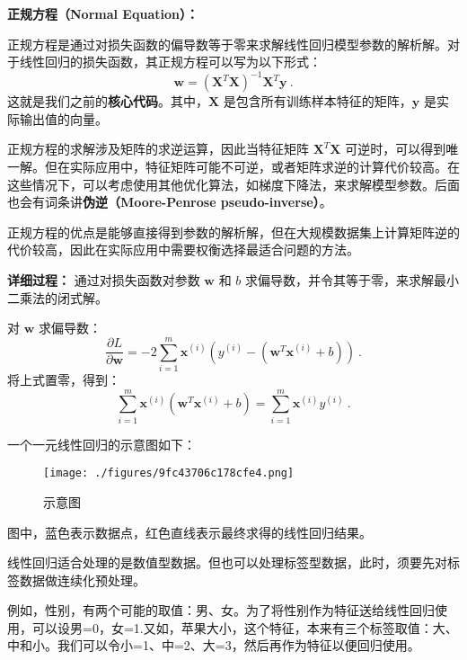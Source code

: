 \textbf{正规方程（Normal Equation）：}

正规方程是通过对损失函数的偏导数等于零来求解线性回归模型参数的解析解。对于线性回归的损失函数，其正规方程可以写为以下形式：
\begin{equation}
\mathbf{w} = (\mathbf{X}^T \mathbf{X})^{-1} \mathbf{X}^T \mathbf{y}~.
\end{equation}
这就是我们之前的\textbf{核心代码}。其中，$\mathbf{X}$ 是包含所有训练样本特征的矩阵，$\mathbf{y}$ 是实际输出值的向量。

正规方程的求解涉及矩阵的求逆运算，因此当特征矩阵 $\mathbf{X}^T \mathbf{X}$ 可逆时，可以得到唯一解。但在实际应用中，特征矩阵可能不可逆，或者矩阵求逆的计算代价较高。在这些情况下，可以考虑使用其他优化算法，如梯度下降法，来求解模型参数。后面也会有词条讲\textbf{伪逆（Moore-Penrose pseudo-inverse）}。

正规方程的优点是能够直接得到参数的解析解，但在大规模数据集上计算矩阵逆的代价较高，因此在实际应用中需要权衡选择最适合问题的方法。

\begin{example}{\textbf{详细过程：}
通过对损失函数对参数 $\mathbf{w}$ 和 $b$ 求偏导数，并令其等于零，来求解最小二乘法的闭式解。}

对 $\mathbf{w}$ 求偏导数：
\begin{equation}
\frac{\partial L}{\partial \mathbf{w}} = -2 \sum_{i=1}^{m} \mathbf{x}^{(i)} (y^{(i)} - (\mathbf{w}^T \mathbf{x}^{(i)} + b))~.
\end{equation}
将上式置零，得到：
\begin{equation}
\sum_{i=1}^{m} \mathbf{x}^{(i)} (\mathbf{w}^T \mathbf{x}^{(i)} + b) = \sum_{i=1}^{m} \mathbf{x}^{(i)} y^{(i)}~.
\end{equation}

\end{example}

一个一元线性回归的示意图如下：
\begin{figure}[ht]
\centering
\texttt{[image: ./figures/9fc43706c178cfe4.png]}
\caption{示意图} \label{fig_LiGr_1}
\end{figure}
图中，蓝色表示数据点，红色直线表示最终求得的线性回归结果。

线性回归适合处理的是数值型数据。但也可以处理标签型数据，此时，须要先对标签数据做连续化预处理。

例如，性别，有两个可能的取值：男、女。为了将性别作为特征送给线性回归使用，可以设男=0，女=1.又如，苹果大小，这个特征，本来有三个标签取值：大、中和小。我们可以令小=1、中=2、大=3，然后再作为特征以便回归使用。

